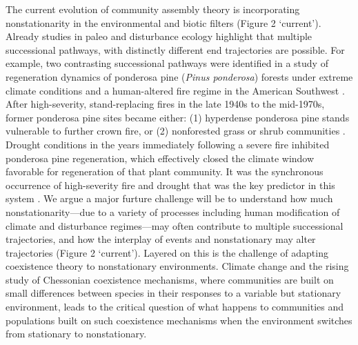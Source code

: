 \documentclass[11pt,a4paper,oneside]{article}
\begin{document}
The current evolution of community assembly theory is incorporating nonstationarity in the environmental and biotic filters (Figure 2 `current'). Already studies in paleo and disturbance ecology highlight that multiple successional pathways, with distinctly different end trajectories are possible. For example, two contrasting successional pathways were identified in a study of regeneration dynamics of ponderosa pine (\emph{Pinus ponderosa}) forests under extreme climate conditions and a human-altered fire regime in the American Southwest \citep{Savage2013}. After high-severity, stand-replacing fires in the late 1940s to the mid-1970s, former ponderosa pine sites became either: (1) hyperdense ponderosa pine stands vulnerable to further crown fire, or (2) nonforested grass or shrub communities \citep{Savage2005}. Drought conditions in the years immediately following a severe fire inhibited ponderosa pine regeneration, which effectively closed the climate window favorable for regeneration of that plant community. It was the synchronous occurrence of high-severity fire and drought that was the key predictor in this system \citep{Savage2013}. We argue a major furture challenge will be to understand how much nonstationarity---due to a variety of processes including human modification of climate and disturbance regimes---may often contribute to multiple successional trajectories, and how the interplay of events and nonstationary may alter trajectories (Figure 2 `current'). Layered on this is the challenge of adapting coexistence theory to nonstationary environments. Climate change and the rising study of Chessonian coexistence mechanisms, where communities are built on small differences between species in their responses to a variable but stationary environment, leads to the critical question of what happens to communities and populations built on such coexistence mechanisms when the environment switches from stationary to nonstationary. \\ 
\end{document}
